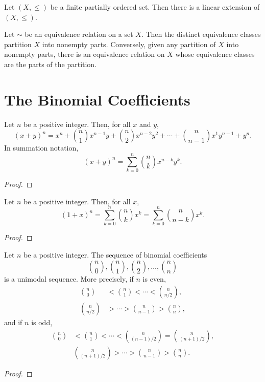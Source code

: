 \begin{theorem}
    \label{thm:4.5.2}
Let $(X, \leq)$ be a finite partially ordered set. Then there is a linear extension of $(X, \leq)$.
\end{theorem} 

\begin{theorem}
    \label{thm:4.5.3}
Let $\sim$ be an equivalence relation on a set $X$. Then the distinct equivalence classes partition $X$ into nonempty parts. Conversely, given any partition of $X$ into nonempty parts, there is an equivalence relation on $X$ whose equivalence classes are the parts of the partition.
\end{theorem} 

\chapter{The Binomial Coefficients}

\begin{theorem}
    \label{thm:5.2.1}
Let \( n \) be a positive integer. Then, for all \( x \) and \( y \),
\[
(x+y)^{n}=x^{n}+\binom{n}{1}x^{n-1}y+\binom{n}{2}x^{n-2}y^{2}+\cdots+\binom{n}{n-1}x^{1}y^{n-1}+y^{n}.
\]
In summation notation,
\[
(x+y)^n=\sum_{k=0}^n\binom{n}{k} x^{n-k} y^k.
\]
\end{theorem}
\begin{proof}
\end{proof}


\begin{theorem}
    \label{thm:5.2.2}
Let \( n \) be a positive integer. Then, for all \( x \),
\[
(1+x)^n = \sum_{k=0}^n \binom{n}{k} x^k = \sum_{k=0}^n \binom{n}{n-k} x^k.
\]
\end{theorem}
\begin{proof}
\end{proof}

\begin{theorem}
    \label{thm:5.3.1}
Let \( n \) be a positive integer. The sequence of binomial coefficients
\[
\binom{n}{0}, \binom{n}{1}, \binom{n}{2}, \ldots, \binom{n}{n}
\]
is a unimodal sequence. More precisely, if \( n \) is even,
\begin{align*}
\binom{n}{0} &< \binom{n}{1} < \cdots < \binom{n}{n/2}, \\
\binom{n}{n/2} &> \cdots > \binom{n}{n-1} > \binom{n}{n},
\end{align*}
and if \( n \) is odd,
\begin{align*}
\binom{n}{0} &< \binom{n}{1} < \cdots < \binom{n}{(n-1)/2} = \binom{n}{(n+1)/2}, \\
&\binom{n}{(n+1)/2} > \cdots > \binom{n}{n-1} > \binom{n}{n}.
\end{align*}
\end{theorem} 
\begin{proof}  
\end{proof}

